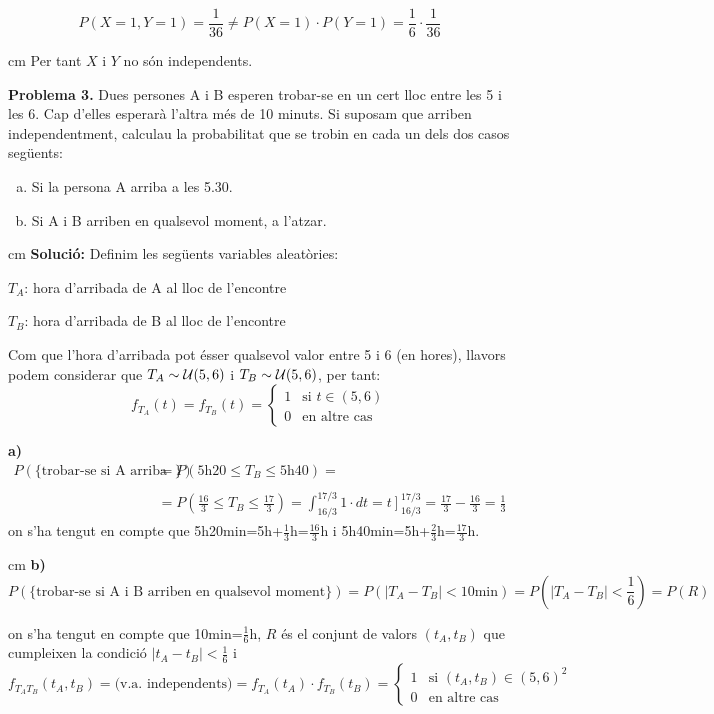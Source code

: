 \documentclass{article}
\begin{document}
\[
P(X=1, Y=1)=\frac{1}{36} \neq P(X=1) \cdot P(Y=1)=\frac{1}{6} \cdot \frac{1}{36}
\]

 cm
\noindent
Per tant $X$ i $Y$ no s\'on independents.

\newpage
\noindent
\textbf{Problema 3.} Dues persones A i B esperen trobar-se en un cert lloc entre
les 5 i les 6. Cap d'elles  esperar\`a l'altra m\'es de 10 minuts. Si
suposam que arriben independentment, calculau la probabilitat que
se trobin en cada un dels dos casos seg\"{u}ents:
\begin{enumerate}[a)]
\item Si la persona A arriba a les 5.30. 
\item Si A i B arriben en qualsevol moment, a l'atzar.
\end{enumerate}

 cm
\noindent
\textbf{Soluci\'o:} Definim les seg\"uents variables aleat\`ories:

$T_A$: hora d'arribada de A al lloc de l'encontre

$T_B$: hora d'arribada de B al lloc de l'encontre

\noindent
Com que l'hora d'arribada pot \'esser qualsevol valor entre 5 i 6 (en hores), llavors
podem considerar que $T_A \sim {\cal U}(5, 6)$ i $T_B \sim {\cal U}(5, 6)$, per tant:
\[
f_{T_A}(t)=f_{T_B}(t)=\begin{cases} 1 & \text{si } t \in (5, 6) \\ 0 & \text{en altre cas} \end{cases}
\]


\noindent
\textbf{a)} 
\[
\begin{array}{rl}
P(\{\text{trobar-se si A arriba a les 5h30}\}) &=P(\text{5h20} \leq T_B \leq \text{5h40})= \\ \\
 &= P(\frac{16}{3} \leq T_B \leq \frac{17}{3})=
 \int_{16/3}^{17/3} 1 \cdot dt = \left. t\right]_{16/3}^{17/3}=
\frac{17}{3}-\frac{16}{3}=\frac{1}{3}
\end{array}
\]
\noindent
on s'ha tengut en compte que 5h20min=5h+$\frac{1}{3}$h=$\frac{16}{3}$h i 
5h40min=5h+$\frac{2}{3}$h=$\frac{17}{3}$h.

 cm
\noindent
\textbf{b)} 
\[
P(\{\text{trobar-se si A i B arriben en qualsevol moment}\}) =  P(|T_A-T_B| < 10\text{min})=
P(|T_A-T_B| < \frac{1}{6})=P(R)
\]

\noindent
on s'ha tengut en compte que 10min=$\frac{1}{6}$h, $R$ \'es el conjunt de valors $(t_A, t_B)$ 
que cumpleixen la condici\'o $|t_A-t_B| < \frac{1}{6}$ i
\[
f_{T_A T_B} (t_A, t_B) = \text{(v.a. independents)}=f_{T_A}(t_A) \cdot f_{T_B}(t_B)=
\begin{cases} 1 & \text{si } (t_A, t_B) \in (5, 6)^2 \\ 0 & \text{en altre cas} \end{cases}
\]
\end{document}
